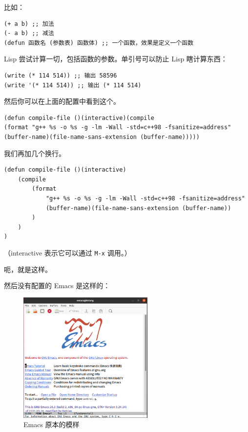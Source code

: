 \documentclass[UTF-8]{ctexart}
\begin{document}
				比如：
				
				\begin{verbatim}
(+ a b) ;; 加法
(- a b) ;; 减法
(defun 函数名 (参数表) 函数体) ;; 一个函数，效果是定义一个函数
				\end{verbatim}
			
				Lisp 尝试计算一切，包括函数的参数。单引号可以防止 Lisp 瞎计算东西：
				
				\begin{verbatim}
(write (* 114 514)) ;; 输出 58596
(write '(* 114 514)) ;; 输出 (* 114 514)
				\end{verbatim}
				
				然后你可以在上面的配置中看到这个。
				
				\begin{verbatim}
(defun compile-file ()(interactive)(compile 
(format "g++ %s -o %s -g -lm -Wall -std=c++98 -fsanitize=address" 
(buffer-name)(file-name-sans-extension (buffer-name)))))
				\end{verbatim}
			
				我们再加几个换行。
				
				\begin{verbatim}
(defun compile-file ()(interactive)
    (compile 
        (format
            "g++ %s -o %s -g -lm -Wall -std=c++98 -fsanitize=address" 
            (buffer-name)(file-name-sans-extension (buffer-name))
        )
    )
)
				\end{verbatim}
			
				（interactive 表示它可以通过 \texttt{M-x} 调用。）
				
				呃，就是这样。
				
				然后没有配置的 Emacs 是这样的：
				
				\begin{figure}[H]
					\centering
					\includegraphics[width=0.6\textwidth]{fig/emacs_orig.png}
					\caption*{Emacs 原本的模样}
				\end{figure}
				
\end{document}
